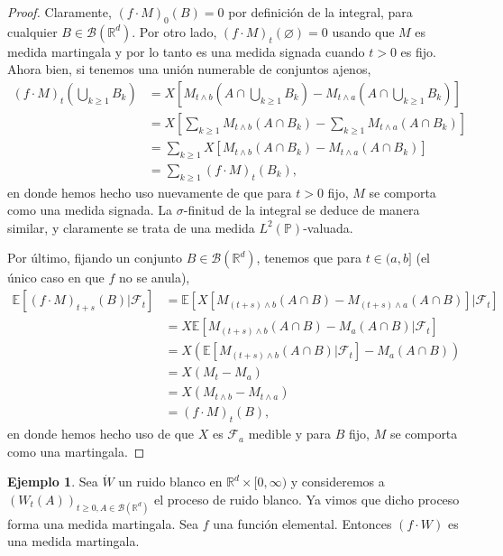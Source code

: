 \documentclass[letterpaper,twoside,12pt]{book}
\newcommand{\R}{\mathbb{R}}
\newcommand{\F}{\mathcal{F}}
\newcommand{\B}{\mathcal{B}}
\newcommand{\E}{\mathbb{E}}
\renewcommand{\P}{\mathbb{P}}
\newcommand{\W}{\dot{W}}
\newcommand{\1}{\mathds{1}}
\theoremstyle{definition}
\theoremstyle{definition}
\theoremstyle{remark}
\theoremstyle{definition}
\theoremstyle{definition}
\theoremstyle{definition}
\theoremstyle{definition}
\newtheorem{ejem}{Ejemplo}
\theoremstyle{definition}
\begin{document}
\begin{proof} 
 Claramente, $(f\cdot M)_0(B)=0$ por definición de la integral, para cualquier $B\in \B(\R^{d})$. Por otro lado, $(f\cdot M)_t(\varnothing)=0$ usando que $M$ es medida martingala y por lo tanto es una medida signada cuando $t>0$ es fijo. Ahora bien, si tenemos una unión numerable de conjuntos ajenos, 
\begin{align*}
      (f\cdot M)_t\left(\bigcup_{k\geq1}B_k\right)&=X \left[M_{t\wedge b}\left(A\cap \bigcup_{k\geq1}B_k\right)-M_{t\wedge a}\left(A\cap \bigcup_{k\geq1}B_k\right)\right]\\
      &=X \left[\sum_{k\geq1}M_{t\wedge b}(A\cap B_k)-\sum_{k\geq1}M_{t\wedge a}(A\cap B_k)\right]\\
      &=\sum_{k\geq1}X \left[M_{t\wedge b}(A\cap B_k)-M_{t\wedge a}(A\cap B_k)\right]\\
      &=\sum_{k\geq1}(f\cdot M)_t(B_k),     
   \end{align*}
en donde hemos hecho uso nuevamente de que para $t>0$ fijo, $M$ se comporta como una medida signada. La $\sigma$-finitud de la integral se deduce de manera similar, y claramente se trata de una medida $L^2(\P)$-valuada.

Por último, fijando un conjunto $B\in \B(\R^{d})$, tenemos que para $t\in (a,b]$ (el único caso en que $f$ no se anula),
\begin{align*}
   \E\left[(f\cdot M)_{t+s}(B)|\F_{t}\right]&=\E\left[X\left[M_{(t+s)\wedge b}(A\cap B)-M_{(t+s)\wedge a}(A\cap B)\right]|\F_t\right]\\
   &=X\E\left[M_{(t+s)\wedge b}(A\cap B)-M_ a (A\cap B)|\F_t\right]\\
   &=X\left(\E\left[M_{(t+s)\wedge b}(A\cap B)|\F_t\right]-M_a(A\cap B)\right)\\
   &=X\left(M_t-M_a\right)\\
   &=X\left(M_{t\wedge b}-M_{t\wedge a}\right)\\
   &=(f\cdot M)_t(B),
\end{align*}
en donde hemos hecho uso de que $X$ es $\F_a$ medible y para $B$ fijo, $M$ se comporta como una martingala.
\end{proof}
\begin{ejem} 
Sea $\W$ un ruido blanco en $\R^{d}\times[0,\infty)$ y consideremos a $(W_t(A))_{t\geq0,A\in \B(\R^d)}$ el proceso de ruido blanco. Ya vimos que dicho proceso forma una medida martingala. Sea $f$ una función elemental. Entonces $(f\cdot W)$ es una medida martingala.
\end{ejem}
\end{document}
